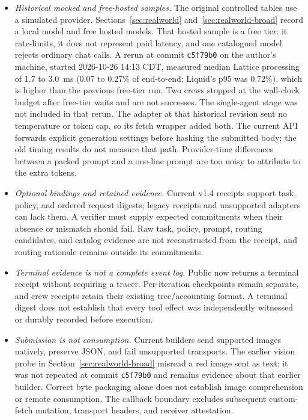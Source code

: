 \begin{itemize}
\item \emph{Historical mocked and free-hosted samples.} The original controlled tables use a simulated provider. Sections~\ref{sec:realworld} and~\ref{sec:realworld-broad} record a local model and free hosted models. That hosted sample is a free tier: it rate-limits, it does not represent paid latency, and one catalogued model rejects ordinary chat calls. A rerun at commit \texttt{c5f79b0} on the author's machine, started 2026-10-26 14:13 CDT, measured median Lattice processing of 1.7 to 3.0~ms (0.07 to 0.27\% of end-to-end; Liquid's p95 was 0.72\%), which is higher than the previous free-tier run. Two crews stopped at the wall-clock budget after free-tier waits and are not successes. The single-agent stage was not included in that rerun. The adapter at that historical revision sent no temperature or token cap, so its fetch wrapper added both. The current API forwards explicit generation settings before hashing the submitted body; the old timing results do not measure that path. Provider-time differences between a packed prompt and a one-line prompt are too noisy to attribute to the extra tokens.
\item \emph{Optional bindings and retained evidence.} Current v1.4 receipts support task, policy, and ordered request digests; legacy receipts and unsupported adapters can lack them. A verifier must supply expected commitments when their absence or mismatch should fail. Raw task, policy, prompt, routing candidates, and catalog evidence are not reconstructed from the receipt, and routing rationale remains outside its commitments.
\item \emph{Terminal evidence is not a complete event log.} Public  now returns a terminal receipt without requiring a tracer. Per-iteration checkpoints remain separate, and crew receipts retain their existing tree/accounting format. A terminal digest does not establish that every tool effect was independently witnessed or durably recorded before execution.
\item \emph{Submission is not consumption.} Current builders send supported images natively, preserve JSON, and fail unsupported transports. The earlier vision probe in Section~\ref{sec:realworld-broad} misread a red image sent as text; it was not repeated at commit \texttt{c5f79b0} and remains evidence about that earlier builder. Correct byte packaging alone does not establish image comprehension or remote consumption. The callback boundary excludes subsequent custom-fetch mutation, transport headers, and receiver attestation.

\end{itemize}
